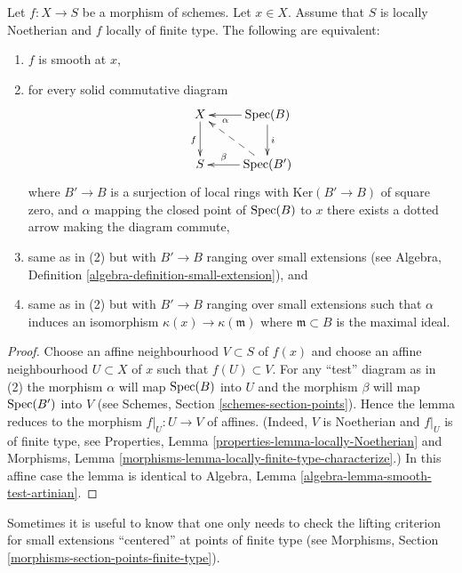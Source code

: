 \begin{lemma}
\label{lemma-lifting-along-artinian-at-point}
Let $f : X \to S$ be a morphism of schemes.
Let $x \in X$.
Assume that $S$ is locally Noetherian and $f$ locally of finite type.
The following are equivalent:
\begin{enumerate}
\item $f$ is smooth at $x$,
\item for every solid commutative diagram
$$
\xymatrix{
X \ar[d]_f & \Spec(B) \ar[d]^i \ar[l]^-\alpha \\
S & \Spec(B') \ar[l]_-{\beta} \ar@{-->}[lu]
}
$$
where $B' \to B$ is a surjection of local rings with
$\text{Ker}(B' \to B)$ of square zero, and $\alpha$ mapping the
closed point of $\mathop{\rm Spec}(B)$ to $x$ there exists
a dotted arrow making the diagram commute,
\item same as in (2) but with $B' \to B$ ranging over small
extensions (see Algebra, Definition \ref{algebra-definition-small-extension}),
and
\item same as in (2) but with $B' \to B$ ranging over small
extensions such that $\alpha$ induces an isomorphism
$\kappa(x) \to \kappa(\mathfrak m)$ where $\mathfrak m \subset B$
is the maximal ideal.
\end{enumerate}
\end{lemma}

\begin{proof}
Choose an affine neighbourhood $V \subset S$ of $f(x)$ and choose an
affine neighbourhood $U \subset X$ of $x$ such that $f(U) \subset V$.
For any ``test'' diagram as in (2) the morphism $\alpha$ will map
$\mathop{\rm Spec}(B)$ into $U$ and the morphism $\beta$ will map $\mathop{\rm Spec}(B')$
into $V$ (see Schemes, Section \ref{schemes-section-points}).
Hence the lemma reduces to the morphism $f|_U : U \to V$ of affines.
(Indeed, $V$ is Noetherian and $f|_U$ is of finite type, see
Properties, Lemma \ref{properties-lemma-locally-Noetherian} and
Morphisms, Lemma \ref{morphisms-lemma-locally-finite-type-characterize}.)
In this affine case the lemma is identical to
Algebra, Lemma \ref{algebra-lemma-smooth-test-artinian}.
\end{proof}

\noindent
Sometimes it is useful to know that one only needs to check the
lifting criterion for small extensions ``centered'' at points
of finite type (see
Morphisms, Section \ref{morphisms-section-points-finite-type}).

